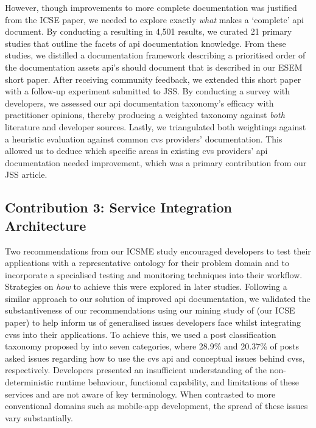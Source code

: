 However, though improvements to more complete documentation was justified from the ICSE paper, we needed to explore exactly \textit{what} makes a `complete' \gls{api} document. By conducting a  resulting in 4,501 results, we curated 21 primary studies that outline the facets of \gls{api} documentation knowledge. From these studies, we distilled a documentation framework describing a prioritised order of the documentation assets \gls{api}'s should document that is described in our ESEM short paper. After receiving community feedback, we extended this short paper with a follow-up experiment submitted to JSS. By conducting a survey with developers, we assessed our \gls{api} documentation taxonomy's efficacy with practitioner opinions, thereby producing a weighted taxonomy against \textit{both} literature and developer sources. Lastly, we triangulated both weightings against a heuristic evaluation against common \gls{cvs} providers' documentation. This allowed us to deduce which specific areas in existing \gls{cvs} providers' \gls{api} documentation needed improvement, which was a primary contribution from our JSS article.

\subsection{Contribution 3: Service Integration Architecture}

Two recommendations from our ICSME study encouraged developers to test their applications with a representative ontology for their problem domain and to incorporate a specialised testing and monitoring techniques into their workflow. Strategies on \textit{how} to achieve this were explored in later studies.  Following a similar approach to our solution of improved \gls{api} documentation, we validated the substantiveness of our recommendations using our mining study of  (our ICSE paper) to help inform us of generalised issues developers face whilst integrating \glspl{cvs} into their applications. To achieve this, we used a  post classification taxonomy proposed by \citet{Beyer:2018fm} into seven categories, where 28.9\% and 20.37\% of posts asked issues regarding how to use the \gls{cvs} \gls{api} and conceptual issues behind \glspl{cvs}, respectively. Developers presented an insufficient understanding of the non-deterministic runtime behaviour, functional capability, and limitations of these services and are not aware of key  terminology. When contrasted to more conventional domains such as mobile-app development, the spread of these issues vary substantially.

